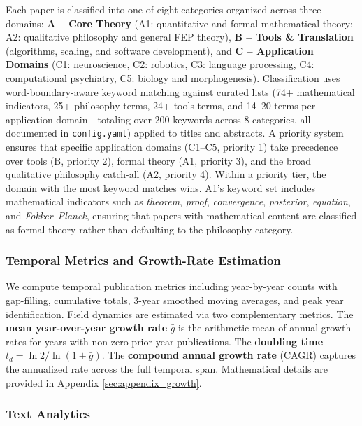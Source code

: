 \documentclass[
  english,
]{article}
\begin{document}
Each paper is classified into one of eight categories organized across
three domains: \textbf{A -- Core Theory} (A1: quantitative and formal
mathematical theory; A2: qualitative philosophy and general FEP theory),
\textbf{B -- Tools \& Translation} (algorithms, scaling, and software
development), and \textbf{C -- Application Domains} (C1: neuroscience,
C2: robotics, C3: language processing, C4: computational psychiatry, C5:
biology and morphogenesis). Classification uses word-boundary-aware
keyword matching against curated lists (74+ mathematical indicators, 25+
philosophy terms, 24+ tools terms, and 14--20 terms per application
domain---totaling over 200 keywords across 8 categories, all documented
in \texttt{config.yaml}) applied to titles and abstracts. A priority
system ensures that specific application domains (C1--C5, priority 1)
take precedence over tools (B, priority 2), formal theory (A1, priority
3), and the broad qualitative philosophy catch-all (A2, priority 4).
Within a priority tier, the domain with the most keyword matches wins.
A1's keyword set includes mathematical indicators such as
\emph{theorem}, \emph{proof}, \emph{convergence}, \emph{posterior},
\emph{equation}, and \emph{Fokker--Planck}, ensuring that papers with
mathematical content are classified as formal theory rather than
defaulting to the philosophy category.

\subsubsection{Temporal Metrics and Growth-Rate
Estimation}\label{temporal-metrics-and-growth-rate-estimation}

We compute temporal publication metrics including year-by-year counts
with gap-filling, cumulative totals, 3-year smoothed moving averages,
and peak year identification. Field dynamics are estimated via two
complementary metrics. The \textbf{mean year-over-year growth rate}
\(\bar{g}\) is the arithmetic mean of annual growth rates for years with
non-zero prior-year publications. The \textbf{doubling time}
\(t_d = \ln 2 / \ln(1 + \bar{g})\). The \textbf{compound annual growth
rate} (CAGR) captures the annualized rate across the full temporal span.
Mathematical details are provided in Appendix \ref{sec:appendix_growth}.

\subsubsection{Text Analytics}\label{text-analytics}
\end{document}
